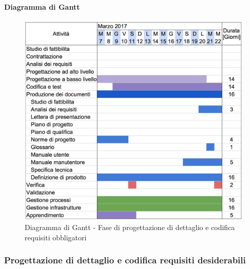 		\paragraph{Diagramma di Gantt}
		\begin{figure}[H]
			\centering
			\includegraphics[height=0.45\textheight]{img/Gantt/f3c.png}
			\caption{Diagramma di Gantt - Fase di progettazione di dettaglio e codifica requisiti obbligatori}
		\end{figure}
	\subsubsection {Progettazione di dettaglio e codifica requisiti desiderabili}
